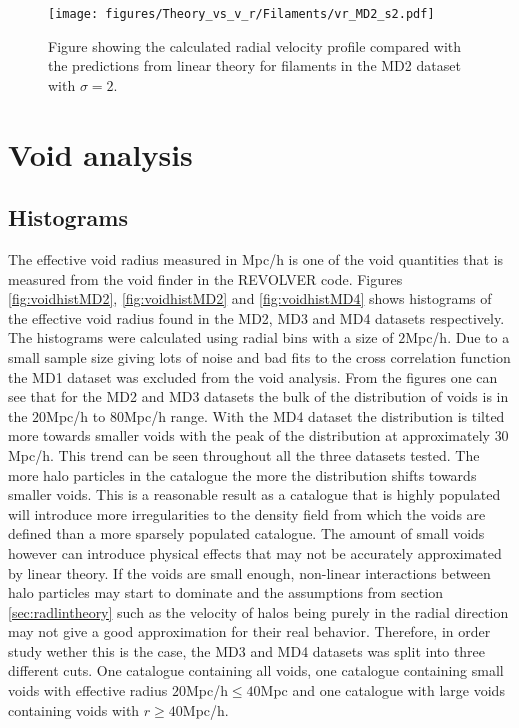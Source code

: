 \begin{figure}[H]
    \texttt{[image: figures/Theory\_vs\_v\_r/Filaments/vr\_MD2\_s2.pdf]}
    \caption{Figure showing the calculated radial velocity profile compared with the predictions from linear theory for filaments in the MD2 dataset with $\sigma=2$.}
    \label{fig:filvrMD2s2}
\end{figure}
\section{Void analysis}\label{sec:void}
\subsection{Histograms}
The effective void radius measured in Mpc/h is one of the void quantities that is measured from the void finder in the REVOLVER code. Figures \ref{fig:voidhistMD2}, \ref{fig:voidhistMD2} and \ref{fig:voidhistMD4} shows histograms of the effective void radius found in the MD2, MD3 and MD4 datasets respectively. The histograms were calculated using radial bins with a size of $2$Mpc/h. Due to a small sample size giving lots of noise and bad fits to the cross correlation function the MD1 dataset was excluded from the void analysis. From the figures one can see that for the MD2 and MD3 datasets the bulk of the distribution of voids is in the $20$Mpc/h to $80$Mpc/h range. With the MD4 dataset the distribution is tilted more towards smaller voids with the peak of the distribution at approximately $30$Mpc/h. This trend can be seen throughout all the three datasets tested. The more halo particles in the catalogue the more the distribution shifts towards smaller voids. This is a reasonable result as a catalogue that is highly populated will introduce more irregularities to the density field from which the voids are defined than a more sparsely populated catalogue. The amount of small voids however can introduce physical effects that may not be accurately approximated by linear theory. If the voids are small enough, non-linear interactions between halo particles may start to dominate and the assumptions from section \ref{sec:radlintheory} such as the velocity of halos being purely in the radial direction may not give a good approximation for their real behavior. Therefore, in order study wether this is the case, the MD3 and MD4 datasets was split into three different cuts. One catalogue containing all voids, one catalogue containing small voids with effective radius $20$Mpc/h$\leq 40$Mpc and one catalogue with large voids containing voids with $r\geq 40$Mpc/h. 


